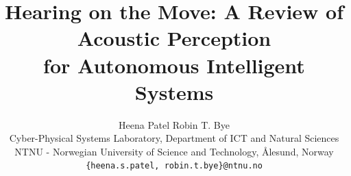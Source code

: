 \documentclass[10pt,twocolumn,letterpaper]{article}
\title{Hearing on the Move: A Review of Acoustic Perception\\for Autonomous Intelligent Systems}
\author{Heena Patel \qquad Robin T. Bye\\
Cyber-Physical Systems Laboratory, Department of ICT and Natural Sciences\\
NTNU - Norwegian University of Science and Technology, \AA{}lesund, Norway\\
{\tt\small \{heena.s.patel, robin.t.bye\}@ntnu.no}
}
\begin{document}
\maketitle
















{
    \small
    
    
}
\end{document}
